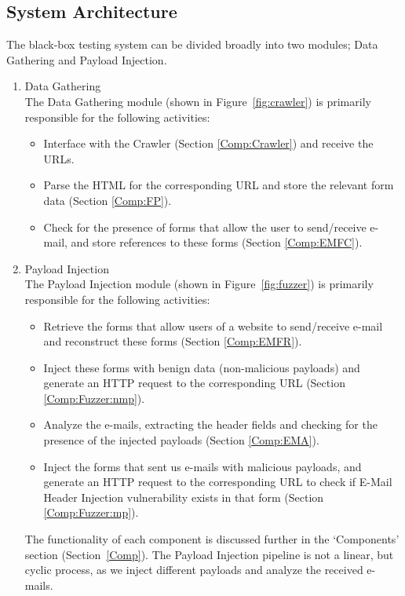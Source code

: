 \subsection{System Architecture}
\label{sys:arch}
The black-box testing system can be divided broadly into two modules; Data Gathering and Payload Injection.
\begin{enumerate}
	\item Data Gathering\\
	The Data Gathering module (shown in Figure~\ref{fig:crawler}) is primarily responsible for the following activities:
	\begin{itemize}
		\item Interface with the Crawler (Section \ref{Comp:Crawler}) and receive the URLs.
		\item Parse the HTML for the corresponding URL and store the relevant form data (Section \ref{Comp:FP}).
		\item Check for the presence of forms that allow the user to send/receive e-mail, and store references to these forms (Section \ref{Comp:EMFC}).
	\end{itemize} 
	\item Payload Injection\\
	The Payload Injection module (shown in Figure~\ref{fig:fuzzer}) is primarily responsible for the following activities:
	\begin{itemize}
		\item Retrieve the forms that allow users of a website to send/receive e-mail and reconstruct these forms (Section \ref{Comp:EMFR}).
		\item Inject these forms with benign data (non-malicious payloads) and generate an HTTP request to the corresponding URL (Section \ref{Comp:Fuzzer:nmp}).
		\item Analyze the e-mails, extracting the header fields and checking for the presence of the injected payloads (Section \ref{Comp:EMA}).
		\item Inject the forms that sent us e-mails with malicious payloads, and generate an HTTP request to the corresponding URL to check if E-Mail Header Injection vulnerability exists in that form (Section \ref{Comp:Fuzzer:mp}).
	\end{itemize} 
	The functionality of each component is discussed further in the `Components' section (Section~\ref{Comp}). The Payload Injection pipeline is not a linear, but cyclic process, as we inject different payloads and analyze the received e-mails.
\end{enumerate}

